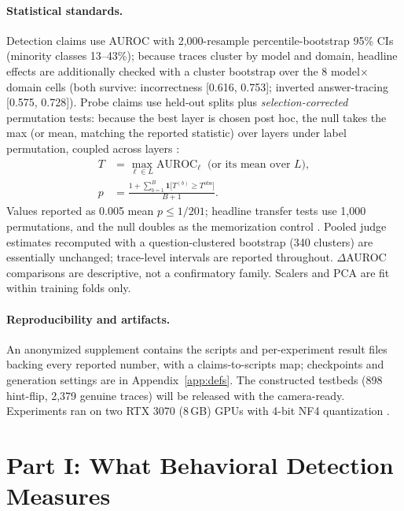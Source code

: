 \documentclass[11pt]{article}
\begin{document}
\paragraph{Statistical standards.} Detection claims use AUROC with 2{,}000-resample percentile-bootstrap 95\% CIs (minority classes 13--43\%); because traces cluster by model and domain, headline effects are additionally checked with a cluster bootstrap over the 8 model$\times$domain cells (both survive: incorrectness [0.616, 0.753]; inverted answer-tracing [0.575, 0.728]). Probe claims use held-out splits plus \emph{selection-corrected} permutation tests: because the best layer is chosen post hoc, the null takes the max (or mean, matching the reported statistic) over layers under label permutation, coupled across layers \citep{nichols2002nonparametric}:
\begin{equation}\label{eq:perm}
\begin{aligned}
T &= \max_{\ell\in L}\mathrm{AUROC}_\ell \;\;\text{(or its mean over } L),\\[2pt]
p &= \frac{1 + \sum_{b=1}^{B}\mathbf{1}\bigl[T^{(b)} \ge T^{\mathrm{obs}}\bigr]}{B+1}.
\end{aligned}
\end{equation}
Values reported as 0.005 mean $p \leq 1/201$; headline transfer tests use 1{,}000 permutations, and the null doubles as the memorization control \citep{hewitt2019control}. Pooled judge estimates recomputed with a question-clustered bootstrap (340 clusters) are essentially unchanged; trace-level intervals are reported throughout. $\Delta$AUROC comparisons are descriptive, not a confirmatory family. Scalers and PCA are fit within training folds only.

\paragraph{Reproducibility and artifacts.} An anonymized supplement contains the scripts and per-experiment result files backing every reported number, with a claims-to-scripts map; checkpoints and generation settings are in Appendix~\ref{app:defs}. The constructed testbeds (898 hint-flip, 2{,}379 genuine traces) will be released with the camera-ready. Experiments ran on two RTX 3070 (8\,GB) GPUs with 4-bit NF4 quantization \citep{dettmers2023qlora}.

\section{Part I: What Behavioral Detection Measures}
\label{sec:audit}
\end{document}
